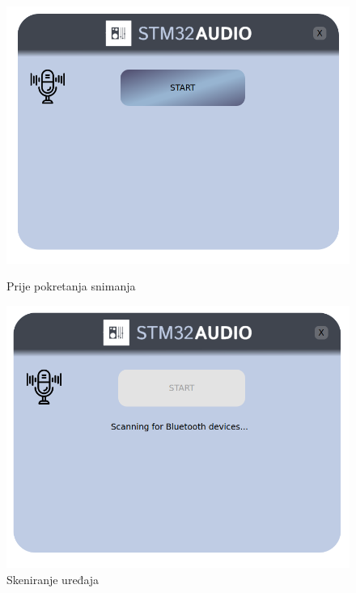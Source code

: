 \begin{figure}[ht]
	\begin{minipage}[t]{0.4\textwidth}
		\includegraphics[width=\linewidth]{imgs/recording_form}
		\caption{Prije pokretanja snimanja}
		\label{fig:recording_form}
	\end{minipage}
	\hspace*{\fill}
	\begin{minipage}[t]{0.4\textwidth}
		\includegraphics[width=\linewidth]{imgs/recording_form_2}
		\caption{Skeniranje uređaja}
		\label{fig:recording_form_2}
	\end{minipage}
\end{figure}

